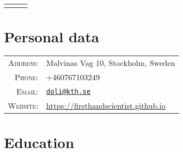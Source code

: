 \documentclass[a4paper,10pt]{article}
\begin{document}
\pagestyle{empty}


\begin{center}
  \begin{tabular}{lcr}
    \par{\centering{\Huge Dong Liu}\bigskip\par} & & %
  \end{tabular}
\end{center}

\section{Personal data}

\begin{tabular}{rl}
  \textsc{Address:} & Malvinas Vag 10, Stockholm, Sweden \\
  \textsc{Phone:} & +460767103249 \\
  \textsc{Email:} & \href{mailto:doli@kth.se}{\nolinkurl{doli@kth.se}} \\
  \textsc{Website:} & \href{https://firsthandscientist.github.io}{https://firsthandscientist.github.io}\\
\end{tabular}


\section{Education}
\end{document}
